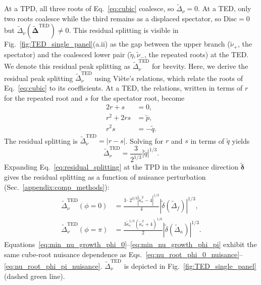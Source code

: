 \documentclass[%
  reprint,
  amsmath,amssymb,
  aps,
  prapplied,
  superscriptaddress,
  longbibliography]{revtex4-2}
\begin{document}
At a TPD, all three roots of Eq.~\ref{eq:cubic} coalesce, so $\tilde{\Delta}_\nu = 0$. At a TED, only two roots coalesce while the third remains as a displaced spectator, so $\mathrm{Disc} = 0$ but $\tilde{\Delta}_\nu(\boldsymbol{\tilde{\Delta}}^\text{TED}) \neq 0$. This residual splitting is visible in Fig.~\ref{fig:TED_single_panel}(a.ii) as the gap between the upper branch ($\tilde{\nu}_+$, the spectator) and the coalesced lower pair ($\tilde{\eta}, \tilde{\nu}_-$, the repeated roots) at the TED. We denote this residual peak splitting as $\tilde{\Delta}_\nu^\text{TED}$ for brevity. Here, we derive the residual peak splitting $\tilde{\Delta}_\nu^\text{TED}$ using Viète's relations, which relate the roots of Eq.~\ref{eq:cubic} to its coefficients. At a TED, the relations, written in terms of $r$ for the repeated root and $s$ for the spectator root, become
\begin{align}
       2r + s &= 0, \label{eq:vieta1} \\
       r^2 + 2rs &= \tilde{p}, \label{eq:vieta2} \\
       r^2 s &= -\tilde{q}. \label{eq:vieta3}
\end{align}
The residual splitting is $\tilde{\Delta}_\nu^\text{TED} = |r - s|$. Solving for $r$ and $s$ in terms of $\tilde{q}$ yields
\begin{equation}\label{eq:residual_splitting}
    \tilde{\Delta}_\nu^\text{TED} = \frac{3}{2^{1/3}} |\tilde{q}|^{1/3}.
\end{equation}
Expanding Eq.~\ref{eq:residual_splitting} at the TPD in the nuisance direction $\boldsymbol{\tilde{\delta}}$ gives the residual splitting as a function of nuisance perturbation (Sec.~\ref{appendix:comp_methods}):
\begin{align}
    \tilde{\Delta}_\nu^\text{TED}(\phi = 0) &= \frac{3 \cdot 2^{2/3} \left|\tilde{\kappa}_c^2 - 4\right|^{1/3}}{4} \left|\tilde{\delta}(\tilde{\Delta}_f)\right|^{1/3}, \label{eq:min_nu_growth_phi_0} \\
    \tilde{\Delta}_\nu^\text{TED}(\phi = \pi) &= \frac{3\tilde{\kappa}_c^{1/3} \left(\tilde{\kappa}_c^2 + 4\right)^{1/6}}{2} \left|\tilde{\delta}(\tilde{\Delta}_\kappa)\right|^{1/3}. \label{eq:min_nu_growth_phi_pi}
\end{align}
Equations~\ref{eq:min_nu_growth_phi_0}--\ref{eq:min_nu_growth_phi_pi} exhibit the same cube-root nuisance dependence as Eqs.~\ref{eq:nu_root_phi_0_nuisance}--\ref{eq:nu_root_phi_pi_nuisance}. $\tilde{\Delta}_\nu^\text{TED}$ is depicted in Fig.~\ref{fig:TED_single_panel} (dashed green line). 
\end{document}
